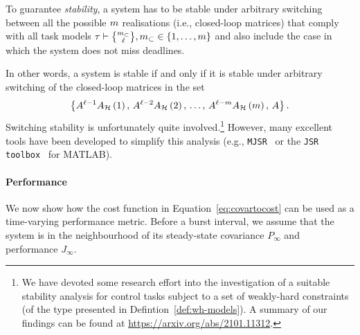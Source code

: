 \begin{definition}
To guarantee \emph{\switchingstability{} stability}, a system has to be stable under arbitrary switching between all the possible $m$ realisations (i.e., closed-loop matrices) that comply with all task models $\tau \vdash \genfrac{\{}{\}}{0pt}{}{\nummisses_\subset}{\numtotalanalysed}, \nummisses_\subset \in \{1, \dots,\nummisses\}$ and also include the case in which the system does not miss deadlines.
\end{definition}
In other words, a system is \switchingstability{} stable if and only if it is stable under arbitrary switching of the closed-loop matrices in the set
%
\begin{equation}
    \left\{ A^{\ell-1}A_{\mathcal{H}}\left(1\right),\, A^{\ell-2}A_{\mathcal{H}}\left(2\right),\, \ldots,\, A^{\ell-m}A_{\mathcal{H}}\left(m\right),\, A \right\}.
\end{equation}
%
Switching stability is unfortunately quite involved.\footnote{We have devoted some research effort into the investigation of a suitable stability analysis for control tasks subject to a set of weakly-hard constraints (of the type presented in Defintion~\ref{def:wh-models}). A summary of our findings can be found at \url{https://arxiv.org/abs/2101.11312}.}
However, many excellent tools have been developed to simplify this analysis (e.g., \texttt{MJSR}~\cite{Maggio:2020} or the \texttt{JSR toolbox}~\cite{Jungers:2014} for MATLAB).

\paragraph*{Performance}%

We now show how the cost function in
Equation~\eqref{eq:covartocost}
can be used as a time-varying
performance metric. Before a burst interval, we assume that the
system is in the neighbourhood of its steady-state covariance
$P_\infty$ and performance $J_\infty$.

